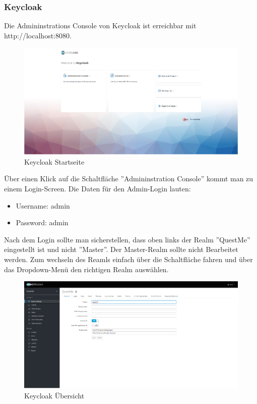 \subsubsection{Keycloak}
Die Admininstrations Console von Keycloak ist erreichbar mit http://localhost:8080. 

\begin{figure}[H]
    \centering
    \includegraphics[width=1.0\textwidth]{bilder/administrationshandbuch/keycloak_startseite.png}
    \caption{Keycloak Startseite}
    \label{fig:Keycloak_Startseite}
\end{figure}

\noindent Über einen Klick auf die Schaltfläche ''Admininstration Console'' kommt man zu einem Login-Screen.
Die Daten für den Admin-Login lauten: 
\begin{itemize}
    \item Username: admin
    \item Password: admin
\end{itemize}

\noindent Nach dem Login sollte man sicherstellen, dass oben links der Realm ''QuestMe'' eingestellt ist 
und nicht ''Master''. Der Master-Realm sollte nicht Bearbeitet werden. 
Zum wechseln des Reamls einfach über die Schaltfläche fahren und über das Dropdown-Menü den richtigen Realm auswählen. 

\begin{figure}[H]
    \centering
    \includegraphics[width=1.0\textwidth]{bilder/administrationshandbuch/keycloak_nach_login.png}
    \caption{Keycloak Übersicht}
    \label{fig:Keycloak_Uebersicht}
\end{figure}

